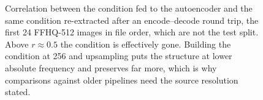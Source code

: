 \begin{figure}[t]
\centering
{}
\caption{Correlation between the condition fed to the autoencoder and the same
condition re-extracted after an encode--decode round trip, the first 24
FFHQ-512 images in file order, which are not the test split. Above
$r{\approx}0.5$ the condition is effectively gone. Building the condition at 256
and upsampling puts the
structure at lower absolute frequency and preserves far more, which is why
comparisons against older pipelines need the source resolution stated.}
\label{fig:vae}
\end{figure}
